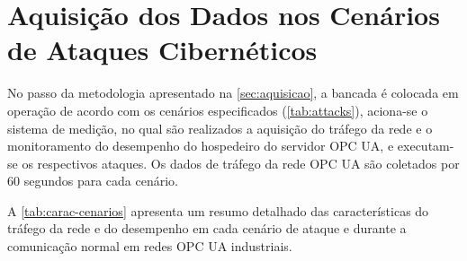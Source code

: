 \section{Aquisição dos Dados nos Cenários de Ataques Cibernéticos} \label{sec:exec-attacks}

    No passo da metodologia apresentado na \autoref{sec:aquisicao}, a bancada é colocada em operação de acordo com os cenários especificados (\autoref{tab:attacks}), aciona-se o sistema de medição, no qual são realizados a aquisição do tráfego da rede e o monitoramento do desempenho do hospedeiro do servidor OPC UA, e executam-se os respectivos ataques. Os dados de tráfego da rede OPC UA são coletados por 60 segundos para cada cenário.

    A \autoref{tab:carac-cenarios} apresenta um resumo detalhado das características do tráfego da rede e do desempenho em cada cenário de ataque e durante a comunicação normal em redes OPC UA industriais.

